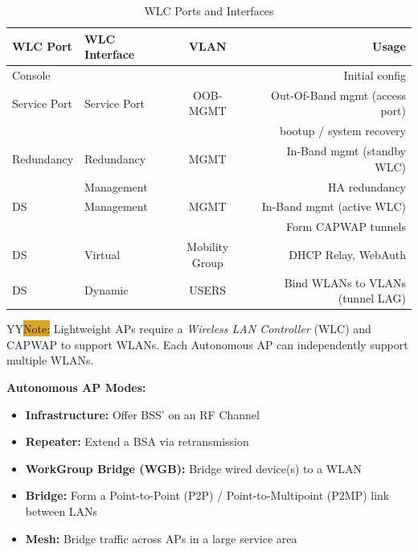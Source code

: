 \documentclass[12pt]{article}
\newcommand{\printColor}{Y}								%
\newcommand{\note}[1]{\if\printColor Y{\colorbox{#1}{Note:}}\else{\underline{Note:}}\fi}
\begin{document}
	\begin{table}[H]
	\centering
	\caption{WLC Ports and Interfaces \label{tab:WLC PORTS}}
	\begin{tabular}{llcr}\hline
	\textbf{WLC Port}	& \textbf{WLC Interface}	& \textbf{VLAN}		& \textbf{Usage}\\\hline
	Console		&					&				& Initial config\\\hline
	Service Port		& Service Port			& OOB-MGMT		& Out-Of-Band mgmt (access port)\\
				&					&				& bootup / system recovery\\\hline
	Redundancy	& Redundancy			& MGMT			& In-Band mgmt (standby WLC)\\
				& Management			&				& HA redundancy\\\hline
	DS			& Management			& MGMT			& In-Band mgmt (active WLC)\\
				&					&				& Form CAPWAP tunnels\\\hline
	DS			& Virtual				& Mobility Group		& DHCP Relay, WebAuth\\\hline
	DS			& Dynamic				& USERS			& Bind WLANs to VLANs (tunnel LAG)\\\hline
	\end{tabular}\end{table}
	\note{Goldenrod} Lightweight APs require a \textit{Wireless LAN Controller} (WLC) and CAPWAP to support WLANs. Each Autonomous AP can independently support multiple WLANs.

	\textbf{Autonomous AP Modes:}
	\begin{itemize} \itemsep -5pt
		\label{itm:AUTONOMOUS AP}
		\item{\textbf{Infrastructure:} Offer BSS' on an RF Channel}
		\item{\textbf{Repeater:} Extend a BSA via retransmission}
		\item{\textbf{WorkGroup Bridge (WGB):} Bridge wired device(s) to a WLAN}
		\item{\textbf{Bridge:} Form a Point-to-Point (P2P) / Point-to-Multipoint (P2MP) link between LANs}
		\item{\textbf{Mesh:} Bridge traffic across APs in a large service area}
	\end{itemize}
\end{document}
